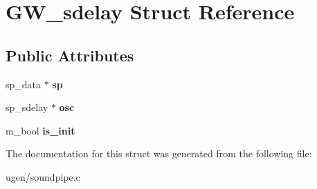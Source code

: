\hypertarget{structGW__sdelay}{}\section{G\+W\+\_\+sdelay Struct Reference}
\label{structGW__sdelay}
\subsection*{Public Attributes}
\begin{DoxyCompactItemize}
\item 
\hypertarget{structGW__sdelay_a6909885e950978eaca81c49431e32908}{}\label{structGW__sdelay_a6909885e950978eaca81c49431e32908} 
sp\+\_\+data $\ast$ {\bfseries sp}
\item 
\hypertarget{structGW__sdelay_adfb3284d6b0fd1408789f9f849c4cc5c}{}\label{structGW__sdelay_adfb3284d6b0fd1408789f9f849c4cc5c} 
sp\+\_\+sdelay $\ast$ {\bfseries osc}
\item 
\hypertarget{structGW__sdelay_a4ef58779c4896fd4318f1a79b4cf0ac4}{}\label{structGW__sdelay_a4ef58779c4896fd4318f1a79b4cf0ac4} 
m\+\_\+bool {\bfseries is\+\_\+init}
\end{DoxyCompactItemize}


The documentation for this struct was generated from the following file\+:\begin{DoxyCompactItemize}
\item 
ugen/soundpipe.\+c\end{DoxyCompactItemize}
